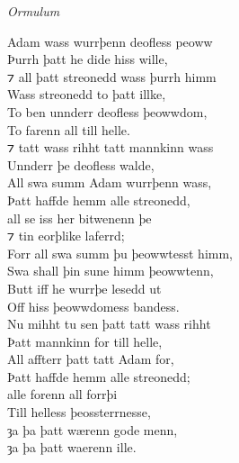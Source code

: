 \begin{texts}{\textit{Ormulum}}
\begin{textglossed}
\internallinenumbers*{}
Adam wass wurrþenn deofless peoww\\
Þurrh þatt he dide hiss wille,\\
⁊ all þatt streonedd wass þurrh himm\\
Wass streonedd to þatt illke,\\
To ben unnderr deofless þeowwdom,\\
To farenn all till helle.\\
⁊ tatt wass rihht tatt mannkinn wass\\
Unnderr þe deofless walde,\\
All swa summ Adam wurrþenn wass,\\
Þatt haffde hemm alle streonedd,\\
all se iss her bitwenenn þe\\
⁊ tin eorþlike laferrd;\\
Forr all swa summ þu þeowwtesst himm,\\
Swa shall þin sune himm þeowwtenn,\\
Butt iff he wurrþe lesedd ut\\
Off hiss þeowwdomess bandess.\\
Nu mihht tu sen þatt tatt wass rihht\\
Þatt mannkinn for till helle,\\
All affterr þatt tatt Adam for,\\ 
Þatt haffde hemm alle streonedd;\\
alle forenn all forrþi\\
Till helless þeossterrnesse,\\
ȝa þa þatt wærenn gode menn,\\
ȝa þa þatt waerenn ille.
\end{textglossed}
\end{texts}



